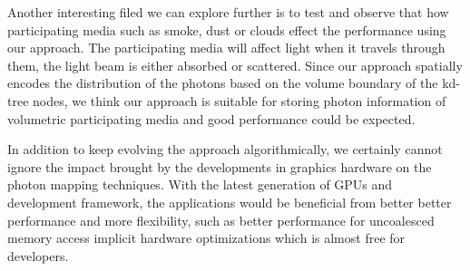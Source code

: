 Another interesting filed we can explore further is to test and observe that how participating media such as smoke, dust or clouds effect the performance using our approach. The participating media will affect light when it travels through them, the light beam is either absorbed or scattered. Since our approach spatially encodes the distribution of the photons based on the volume boundary of the kd-tree nodes, we think our approach is suitable for storing photon information of volumetric participating media and good performance could be expected. 

In addition to keep evolving the approach algorithmically, we certainly cannot ignore the impact brought by the developments in graphics hardware on the photon mapping techniques. With the latest generation of GPUs and development framework, the applications would be beneficial from better better performance and more flexibility, such as better performance for uncoalesced memory access implicit hardware optimizations which is almost free for developers. 